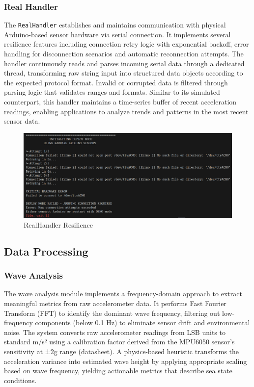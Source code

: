 \documentclass{article}
\begin{document}
    \subsubsection{Real Handler}
    The \texttt{RealHandler} establishes and maintains communication with physical Arduino-based sensor hardware via serial connection. It implements several resilience features including connection retry logic with exponential backoff, error handling for disconnection scenarios and automatic reconnection attempts. The handler continuously reads and parses incoming serial data through a dedicated thread, transforming raw string input into structured data objects according to the expected protocol format. Invalid or corrupted data is filtered through parsing logic that validates ranges and formats. Similar to its simulated counterpart, this handler maintains a time-series buffer of recent acceleration readings, enabling applications to analyze trends and patterns in the most recent sensor data.
    
    \begin{figure} [h]
        \centering
        \includegraphics[width=0.75\linewidth]{assets/RealHandler.png}
        \caption{RealHandler Resilience}
        \label{fig:enter-label}
    \end{figure}

\subsection{Data Processing}

    \subsubsection{Wave Analysis}
    The wave analysis module implements a frequency-domain approach to extract meaningful metrics from raw accelerometer data. It performs Fast Fourier Transform (FFT) to identify the dominant wave frequency, filtering out low-frequency components (below 0.1 Hz) to eliminate sensor drift and environmental noise. The system converts raw accelerometer readings from LSB units to standard m/s² using a calibration factor derived from the MPU6050 sensor's sensitivity at ±2g range (datasheet). A physics-based heuristic transforms the acceleration variance into estimated wave height by applying appropriate scaling based on wave frequency, yielding actionable metrics that describe sea state conditions.
\end{document}

